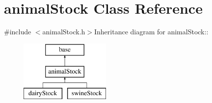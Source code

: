 \hypertarget{classanimal_stock}{
\section{animalStock Class Reference}
\label{classanimal_stock}
}


{\ttfamily \#include $<$animalStock.h$>$}Inheritance diagram for animalStock::\begin{figure}[H]
\begin{center}
\leavevmode
\includegraphics[height=3cm]{classanimal_stock}
\end{center}
\end{figure}
